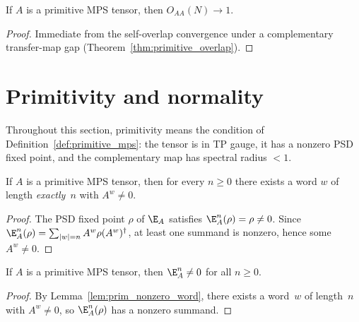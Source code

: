 \begin{theorem}\label{thm:prim_overlap_one}
    \leanok
    If $A$ is a primitive MPS tensor, then
    $O_{AA}(N) \to 1$.
\end{theorem}

\begin{proof}\leanok{}
    Immediate from the self-overlap convergence under a
    complementary transfer-map gap
    (Theorem~\ref{thm:primitive_overlap}).
\end{proof}

\section{Primitivity and normality}

Throughout this section, primitivity means the condition of
Definition~\ref{def:primitive_mps}: the tensor is in TP gauge,
it has a nonzero PSD fixed point, and the complementary map has
spectral radius $< 1$.

\begin{lemma}\label{lem:prim_nonzero_word}
    \leanok
    If $A$ is a primitive MPS tensor,
    then for every $n \ge 0$ there exists a word $w$ of length
    \emph{exactly}~$n$ with $A^w \neq 0$.
\end{lemma}

\begin{proof}\leanok
    The PSD fixed point $\rho$ of $\E_A$ satisfies
    $\E_A^n(\rho) = \rho \neq 0$.
    Since $\E_A^n(\rho) = \sum_{|w|=n} A^w \rho (A^w)^\dagger$,
    at least one summand is nonzero, hence some $A^w \neq 0$.
\end{proof}

\begin{lemma}\label{lem:transfer_pow_ne_zero}
    \leanok
    If $A$ is a primitive MPS tensor, then
    $\E_A^n \neq 0$ for all $n \ge 0$.
\end{lemma}

\begin{proof}\leanok{}
    By Lemma~\ref{lem:prim_nonzero_word},
    there exists a word~$w$ of length~$n$ with $A^w \neq 0$,
    so $\E_A^n(\rho)$ has a nonzero summand.
\end{proof}

